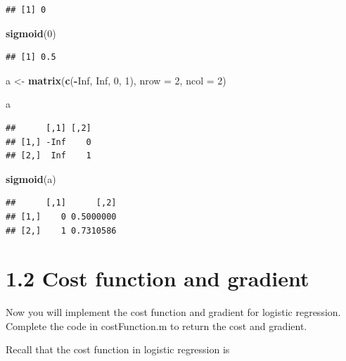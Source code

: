 \documentclass[
]{book}
\newenvironment{Shaded}{\begin{snugshade}}{\end{snugshade}}
\newcommand{\DataTypeTok}[1]{\textcolor[rgb]{0.13,0.29,0.53}{#1}}
\newcommand{\DecValTok}[1]{\textcolor[rgb]{0.00,0.00,0.81}{#1}}
\newcommand{\KeywordTok}[1]{\textcolor[rgb]{0.13,0.29,0.53}{\textbf{#1}}}
\newcommand{\NormalTok}[1]{#1}
\newcommand{\OperatorTok}[1]{\textcolor[rgb]{0.81,0.36,0.00}{\textbf{#1}}}
\newcommand{\OtherTok}[1]{\textcolor[rgb]{0.56,0.35,0.01}{#1}}
\newcommand{\StringTok}[1]{\textcolor[rgb]{0.31,0.60,0.02}{#1}}
\begin{document}
\begin{verbatim}
## [1] 0
\end{verbatim}

\begin{Shaded}
\begin{Highlighting}[]
\KeywordTok{sigmoid}\NormalTok{(}\DecValTok{0}\NormalTok{)}
\end{Highlighting}
\end{Shaded}

\begin{verbatim}
## [1] 0.5
\end{verbatim}

\begin{Shaded}
\begin{Highlighting}[]
\NormalTok{a <-}\StringTok{ }\KeywordTok{matrix}\NormalTok{(}\KeywordTok{c}\NormalTok{(}\OperatorTok{-}\OtherTok{Inf}\NormalTok{, }\OtherTok{Inf}\NormalTok{, }\DecValTok{0}\NormalTok{, }\DecValTok{1}\NormalTok{), }\DataTypeTok{nrow =} \DecValTok{2}\NormalTok{, }\DataTypeTok{ncol =} \DecValTok{2}\NormalTok{)}

\NormalTok{a}
\end{Highlighting}
\end{Shaded}

\begin{verbatim}
##      [,1] [,2]
## [1,] -Inf    0
## [2,]  Inf    1
\end{verbatim}

\begin{Shaded}
\begin{Highlighting}[]
\KeywordTok{sigmoid}\NormalTok{(a)}
\end{Highlighting}
\end{Shaded}

\begin{verbatim}
##      [,1]      [,2]
## [1,]    0 0.5000000
## [2,]    1 0.7310586
\end{verbatim}

\hypertarget{cost-function-and-gradient}{%
\section{1.2 Cost function and gradient}\label{cost-function-and-gradient}}

Now you will implement the cost function and gradient for logistic regression. Complete the code in costFunction.m to return the cost and gradient.

Recall that the cost function in logistic regression is
\end{document}
